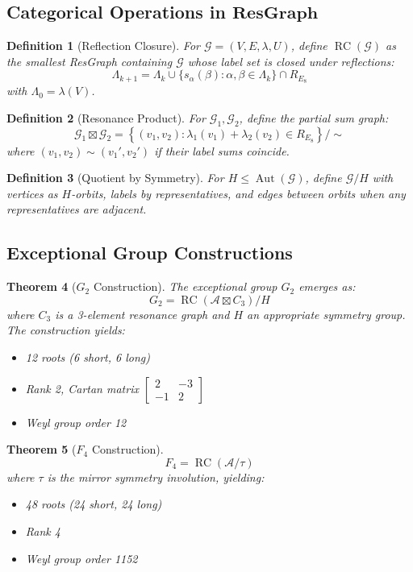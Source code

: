 \documentclass[12pt]{article}
\newtheorem{theorem}{Theorem}
\newtheorem{definition}[theorem]{Definition}
\newcommand{\A}{\mathcal{A}}
\newcommand{\G}{\mathcal{G}}
\newcommand{\ResGraph}{\mathbf{ResGraph}}
\begin{document}
\subsection{Categorical Operations in $\ResGraph$}

\begin{definition}[Reflection Closure]
For $\G = (V,E,\lambda,U)$, define $\operatorname{RC}(\G)$ as the smallest ResGraph containing $\G$ whose label set is closed under reflections:
\[
\Lambda_{k+1} = \Lambda_k \cup \{s_\alpha(\beta) : \alpha, \beta \in \Lambda_k\} \cap R_{E_8}
\]
with $\Lambda_0 = \lambda(V)$.
\end{definition}

\begin{definition}[Resonance Product]
For $\G_1, \G_2$, define the partial sum graph:
\[
\G_1 \boxtimes \G_2 = \left\{ (v_1,v_2) : \lambda_1(v_1) + \lambda_2(v_2) \in R_{E_8} \right\}/\sim
\]
where $(v_1,v_2) \sim (v_1',v_2')$ if their label sums coincide.
\end{definition}

\begin{definition}[Quotient by Symmetry]
For $H \leq \operatorname{Aut}(\G)$, define $\G/H$ with vertices as $H$-orbits, labels by representatives, and edges between orbits when any representatives are adjacent.
\end{definition}

\subsection{Exceptional Group Constructions}

\begin{theorem}[$G_2$ Construction]
The exceptional group $G_2$ emerges as:
\[
G_2 = \operatorname{RC}(\A \boxtimes C_3)/H
\]
where $C_3$ is a 3-element resonance graph and $H$ an appropriate symmetry group. The construction yields:
\begin{itemize}
\item 12 roots (6 short, 6 long)
\item Rank 2, Cartan matrix $\begin{bmatrix} 2 & -3 \\ -1 & 2 \end{bmatrix}$
\item Weyl group order 12
\end{itemize}
\end{theorem}

\begin{theorem}[$F_4$ Construction]
\[
F_4 = \operatorname{RC}(\A/\tau)
\]
where $\tau$ is the mirror symmetry involution, yielding:
\begin{itemize}
\item 48 roots (24 short, 24 long)
\item Rank 4
\item Weyl group order 1152
\end{itemize}
\end{theorem}
\end{document}
